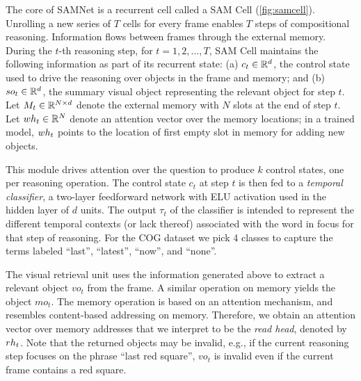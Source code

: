 The core of SAMNet is a recurrent cell called a SAM Cell (\cref{fig:samcell}). 
Unrolling a new series of $T$ cells for every frame enables $T$ steps of compositional
reasoning.
Information flows between frames through the external memory. 
During the $t$-th reasoning step, for $t=1,2, \dots, T$, SAM Cell maintains the following information as part of its recurrent state:
(a) $c_t \in \mathbb{R}^d$, the control state used to drive the reasoning over objects in the frame and memory; and
(b) $so_t  \in \mathbb{R}^d$, the summary visual object representing the relevant object for step $t$.
Let $M_t \in  \mathbb{R}^{N \times d}$ denote the external memory with $N$ slots at the end of step $t$.
Let $wh_t \in  \mathbb{R}^N$ denote an attention vector over the memory locations;
in a trained model, $wh_t$ points to the location of first empty slot in memory for adding new objects.   

This module drives attention over the question to produce $k$ control states, one per reasoning operation. 
The control state $c_t$ at step $t$ is then fed to a \emph{temporal classifier}, 
a two-layer feedforward network with ELU activation used in the hidden layer of $d$ units.
The output $\tau_t$ of the classifier is intended to represent the different temporal contexts (or lack thereof) associated with the word in focus for that step of reasoning.	
For the COG dataset we pick 4 classes to capture the terms labeled ``last'', ``latest'', ``now'', and ``none''.

The visual retrieval unit uses the information generated above to extract a relevant object $vo_t$ from the frame.
A similar operation on memory yields the object $mo_t$. The memory operation is based on an attention mechanism,
and resembles content-based addressing on memory. Therefore, we obtain an attention vector over memory addresses
that we interpret to be the \emph{read head}, denoted by $rh_t$.
Note that the returned objects may be invalid, 
e.g., if the current reasoning step focuses on the phrase ``last red square'', $vo_t$ is invalid 
even if the current frame contains a red square. 

